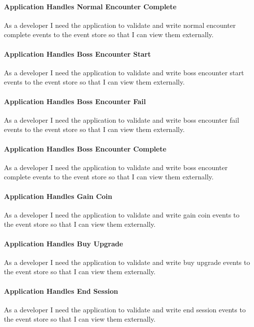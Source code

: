 \paragraph{Application Handles Normal Encounter Complete}
As a developer I need the application to validate and write normal encounter complete events to the event store so that I can view them externally.

\paragraph{Application Handles Boss Encounter Start}
As a developer I need the application to validate and write boss encounter start events to the event store so that I can view them externally.

\paragraph{Application Handles Boss Encounter Fail}
As a developer I need the application to validate and write boss encounter fail events to the event store so that I can view them externally.

\paragraph{Application Handles Boss Encounter Complete}
As a developer I need the application to validate and write boss encounter complete events to the event store so that I can view them externally.

\paragraph{Application Handles Gain Coin}
As a developer I need the application to validate and write gain coin events to the event store so that I can view them externally.

\paragraph{Application Handles Buy Upgrade}
As a developer I need the application to validate and write buy upgrade events to the event store so that I can view them externally.

\paragraph{Application Handles End Session}
As a developer I need the application to validate and write end session events to the event store so that I can view them externally.

